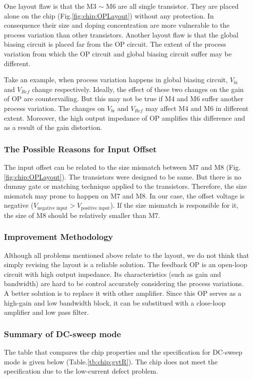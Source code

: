 One layout flaw is that the M3 $\sim$ M6 are all single transistor.
They are placed alone on the chip (Fig.\ref{fig:chip:OPLayout}) without any protection.
In consequence their size and doping concentration are more vulnerable to the process variation than other transistors.
Another layout flaw is that the global biasing circuit is placed far from the OP circuit.
The extent of the process variation from which the OP circuit and global biasing circuit suffer may be different.

Take an example, when process variation happens in global biasing circuit, $V_{bi}$ and $V_{Ref}$ change respectively.
Ideally, the effect of these two changes on the gain of OP are countervailing.
But this may not be true if M4 and M6 suffer another process variation.
The changes on $V_{bi}$ and $V_{Ref}$ may affect M4 and M6 in different extent.
Moreover, the high output impedance of OP amplifies this difference and as a result of the gain distortion.

\subsubsection{The Possible Reasons for Input Offset}
The input offset can be related to the size mismatch between M7 and M8 (Fig.\ref{fig:chip:OPLayout}).
The transistors were designed to be same.
But there is no dummy gate or matching technique applied to the transistors.
Therefore, the size mismatch may prone to happen on M7 and M8.
In our case, the offset voltage is negative ($V_{\text{negative input}} > V_{\text{positive input}}$).
If the size mismatch is responsible for it, the size of M8 should be relatively smaller than M7.

\subsubsection{Improvement Methodology}
Although all problems mentioned above relate to the layout, we do not think that simply revising the layout is a reliable solution.
The feedback OP is an open-loop circuit with high output impedance.
Its characteristics (such as gain and bandwidth) are hard to be control accurately considering the process variations.
A better solution is to replace it with other amplifier.
Since this OP serves as a high-gain and low bandwidth block, it can be substitued with a close-loop amplifier and low pass filter.

\subsubsection{Summary of DC-sweep mode}
The table that compares the chip properties and the specification for DC-sweep mode is given below (Table.\ref{tb:chip:gvtR}).
The chip does not meet the specification due to the low-current defect problem.


